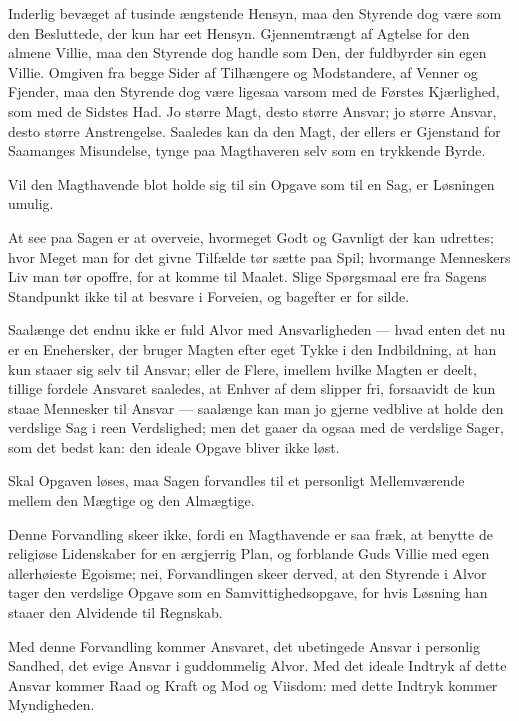 \documentclass[12pt,a4paper]{book}
\newcommand{\apage}[1]{\marginnote{\footnotesize\textit{[#1]}}}
\begin{document}
Inderlig bevæget af tusinde ængstende Hensyn, maa den Styrende dog
være som den Besluttede, der kun har eet Hensyn. Gjennemtrængt af
Agtelse for den almene Villie, maa den Styrende dog handle som Den,
der fuldbyrder sin egen Villie. Omgiven fra begge Sider af
Tilhængere og Modstandere, af Venner og Fjender, maa den Styrende dog
være ligesaa varsom med de Førstes Kjærlighed, som med de Sidstes
Had. Jo større Magt, desto større Ansvar; jo større Ansvar, desto
større Anstrengelse. Saaledes kan da den Magt, der ellers er
Gjenstand for Saamanges Misundelse, tynge paa Magthaveren selv som
en trykkende Byrde.

Vil den Magthavende blot holde sig til sin Opgave som til en Sag, er
Løsningen umulig.

At see paa Sagen er at overveie, hvormeget Godt og Gavnligt der kan
udrettes; hvor Meget man for det givne Tilfælde tør sætte paa Spil;
hvormange Menneskers Liv man tør opoffre, for at komme til Maalet.
Slige Spørgsmaal ere fra Sagens Standpunkt ikke til at besvare i
Forveien, og bagefter er for silde.

Saalænge det endnu ikke er fuld Alvor med Ansvarligheden --- hvad
enten det nu er en Enehersker, der bruger Magten efter eget Tykke i
den Indbildning, at han kun staaer sig selv til Ansvar; eller de
Flere, imellem hvilke Magten er deelt, tillige fordele Ansvaret
saaledes, at Enhver af dem slipper fri, forsaavidt de kun staae
Mennesker til Ansvar --- saalænge kan man jo gjerne vedblive at
holde den verdslige Sag i reen Verdslighed; men det gaaer da ogsaa
med de verdslige Sager, som det bedst kan: den ideale Opgave bliver
ikke løst.

Skal Opgaven løses, maa Sagen forvandles til et personligt
Mellemværende mellem den Mægtige og den Almægtige.

Denne Forvandling skeer ikke, fordi en Magthavende er saa fræk, at
benytte de religiøse \apage{66} Lidenskaber for en ærgjerrig Plan, og forblande
Guds Villie med egen allerhøieste Egoisme; nei, Forvandlingen skeer
derved, at den Styrende i Alvor tager den verdslige Opgave som en
Samvittighedsopgave, for hvis Løsning han staaer den Alvidende til
Regnskab.

Med denne Forvandling kommer Ansvaret, det ubetingede Ansvar i
personlig Sandhed, det evige Ansvar i guddommelig Alvor. Med det
ideale Indtryk af dette Ansvar kommer Raad og Kraft og Mod og
Viisdom: med dette Indtryk kommer Myndigheden.
\end{document}
